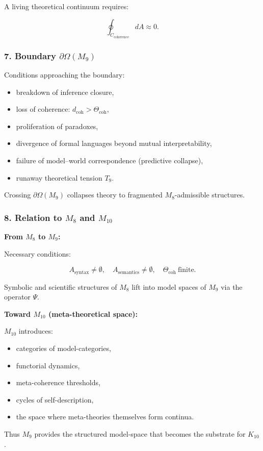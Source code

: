 A living theoretical continuum requires:

\[
\oint_{C_{\mathrm{coherence}}} dA \approx 0.
\]

\subsubsection*{7. Boundary \texorpdfstring{$\partial\Omega(M_9)$}{\partial\Omega(M_9)}}

Conditions approaching the boundary:

\begin{itemize}
    \item breakdown of inference closure,
    \item loss of coherence: $d_{\mathrm{coh}}>\Theta_{\mathrm{coh}}$,
    \item proliferation of paradoxes,
    \item divergence of formal languages beyond mutual interpretability,
    \item failure of model–world correspondence (predictive collapse),
    \item runaway theoretical tension $T_9$.
\end{itemize}

Crossing $\partial\Omega(M_9)$ collapses theory to fragmented $M_8$-admissible structures.

\subsubsection*{8. Relation to \texorpdfstring{$M_8$}{M_8} and $M_{10}$}

\textbf{From $M_8$ to $M_9$:}

Necessary conditions:

\[
A_{\mathrm{syntax}}\neq\emptyset,
\quad
A_{\mathrm{semantics}}\neq\emptyset,
\quad
\Theta_{\mathrm{coh}}\ \text{finite}.
\]

Symbolic and scientific structures of $M_8$ lift into  
model spaces of $M_9$ via the operator $\Psi$.

\textbf{Toward $M_{10}$ (meta-theoretical space):}

$M_{10}$ introduces:

\begin{itemize}
    \item categories of model-categories,
    \item functorial dynamics,
    \item meta-coherence thresholds,
    \item cycles of self-description,
    \item the space where meta-theories themselves form continua.
\end{itemize}

Thus $M_9$ provides the structured model-space that becomes the substrate for $K_{10}$.

